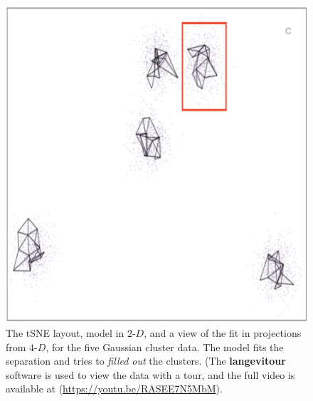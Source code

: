 \documentclass[
  12pt]{article}
\newcommand\gD{$2\text{-}D$}
\begin{document}
\begin{figure}[H]
%
\begin{minipage}{0.33\linewidth}
\includegraphics{figures/five_gau_clusters/sc_tsne_3.png}\end{minipage}%

\caption{\label{fig-gau-tsne-sc}The tSNE layout, model in \gD{}, and a
view of the fit in projections from \(4\text{-}D\), for the five
Gaussian cluster data. The model fits the separation and tries to
\emph{filled out} the clusters. (The \textbf{langevitour} software is
used to view the data with a tour, and the full video is available at
(\url{https://youtu.be/RASEE7N5MbM}).}

\end{figure}%
\end{document}
